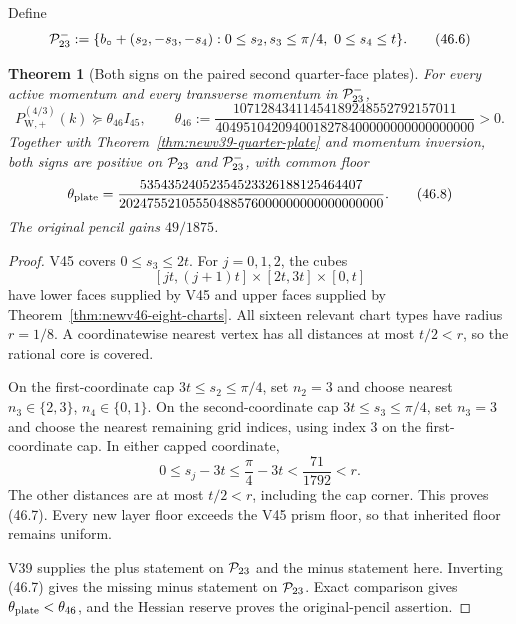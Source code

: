 \documentclass[11pt,oneside]{article}
\newtheorem{theorem}{Theorem}[section]
\theoremstyle{definition}
\theoremstyle{remark}
\begin{document}
Define
\[
 {\cal P}_{23}^{-}:=
 \{b_\circ+(s_2,-s_3,-s_4):
       0\le s_2,s_3\le\pi/4,\ 0\le s_4\le t\}.         \tag{46.6}
\]

\begin{theorem}[Both signs on the paired second quarter-face plates]
\label{thm:newv46-paired-plates}
For every active momentum and every transverse momentum in
\({\cal P}_{23}^{-}\),
\[
 P_{\mathrm W,+}^{(4/3)}(k)
 \succeq\theta_{46}I_{45},\qquad
 \theta_{46}:=
 \frac{10712843411454189248552792157011}
 {4049510420940018278400000000000000000}>0.            \tag{46.7}
\]
Together with Theorem~\ref{thm:newv39-quarter-plate} and momentum
inversion, both signs are positive on \({\cal P}_{23}\) and
\({\cal P}_{23}^{-}\), with common floor
\[
 \theta_{\rm plate}
 =\frac{53543524052354523326188125464407}
 {20247552105550488576000000000000000000}.             \tag{46.8}
\]
The original pencil gains \(49/1875\).
\end{theorem}

\begin{proof}
V45 covers \(0\le s_3\le2t\).  For \(j=0,1,2\), the cubes
\[
 [jt,(j+1)t]\times[2t,3t]\times[0,t]                  \tag{46.9}
\]
have lower faces supplied by V45 and upper faces supplied by
Theorem~\ref{thm:newv46-eight-charts}.  All sixteen relevant chart
types have radius \(r=1/8\).  A coordinatewise nearest vertex has
all distances at most \(t/2<r\), so the rational core is covered.

On the first-coordinate cap \(3t\le s_2\le\pi/4\), set \(n_2=3\)
and choose nearest \(n_3\in\{2,3\}\), \(n_4\in\{0,1\}\).  On the
second-coordinate cap \(3t\le s_3\le\pi/4\), set \(n_3=3\) and
choose the nearest remaining grid indices, using index \(3\) on
the first-coordinate cap.  In either capped coordinate,
\[
 0\le s_j-3t\le\frac{\pi}{4}-3t
 <\frac{71}{1792}<r.                                   \tag{46.10}
\]
The other distances are at most \(t/2<r\), including the cap
corner.  This proves (46.7).  Every new layer floor exceeds the V45
prism floor, so that inherited floor remains uniform.

V39 supplies the plus statement on \({\cal P}_{23}\) and the minus
statement here.  Inverting (46.7) gives the missing minus statement
on \({\cal P}_{23}\).  Exact comparison gives
\(\theta_{\rm plate}<\theta_{46}\), and the Hessian reserve proves
the original-pencil assertion.
\end{proof}
\end{document}
